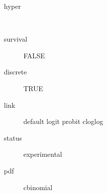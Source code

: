\begin{description}
	\item[hyper]\ 
	\item[survival] FALSE
	\item[discrete] TRUE
	\item[link] default logit probit cloglog
	\item[status] experimental
	\item[pdf] cbinomial
\end{description}
